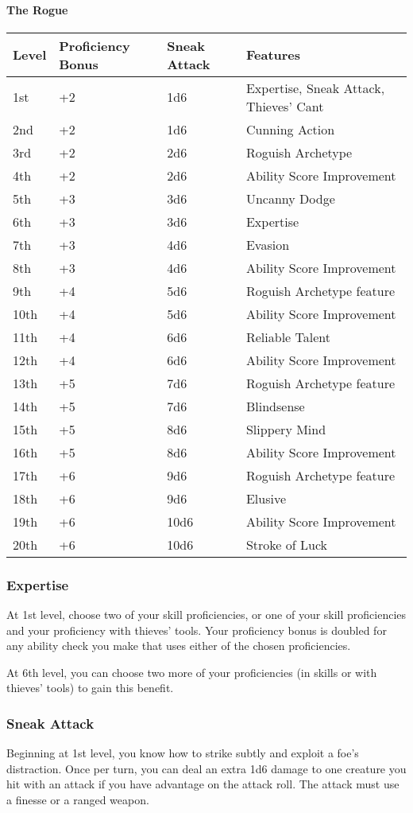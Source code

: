 \documentclass[
]{article}
\begin{document}
\hypertarget{the-rogue}{%
\paragraph{The Rogue}\label{the-rogue}}

\begin{longtable}[]{@{}llll@{}}
\toprule
Level & Proficiency Bonus & Sneak Attack & Features\tabularnewline
\midrule
\endhead
1st & +2 & 1d6 & Expertise, Sneak Attack, Thieves' Cant\tabularnewline
2nd & +2 & 1d6 & Cunning Action\tabularnewline
3rd & +2 & 2d6 & Roguish Archetype\tabularnewline
4th & +2 & 2d6 & Ability Score Improvement\tabularnewline
5th & +3 & 3d6 & Uncanny Dodge\tabularnewline
6th & +3 & 3d6 & Expertise\tabularnewline
7th & +3 & 4d6 & Evasion\tabularnewline
8th & +3 & 4d6 & Ability Score Improvement\tabularnewline
9th & +4 & 5d6 & Roguish Archetype feature\tabularnewline
10th & +4 & 5d6 & Ability Score Improvement\tabularnewline
11th & +4 & 6d6 & Reliable Talent\tabularnewline
12th & +4 & 6d6 & Ability Score Improvement\tabularnewline
13th & +5 & 7d6 & Roguish Archetype feature\tabularnewline
14th & +5 & 7d6 & Blindsense\tabularnewline
15th & +5 & 8d6 & Slippery Mind\tabularnewline
16th & +5 & 8d6 & Ability Score Improvement\tabularnewline
17th & +6 & 9d6 & Roguish Archetype feature\tabularnewline
18th & +6 & 9d6 & Elusive\tabularnewline
19th & +6 & 10d6 & Ability Score Improvement\tabularnewline
20th & +6 & 10d6 & Stroke of Luck\tabularnewline
\bottomrule
\end{longtable}

\hypertarget{expertise}{%
\subsubsection{Expertise}\label{expertise}}

At 1st level, choose two of your skill proficiencies, or one of your
skill proficiencies and your proficiency with thieves' tools. Your
proficiency bonus is doubled for any ability check you make that uses
either of the chosen proficiencies.

At 6th level, you can choose two more of your proficiencies (in skills
or with thieves' tools) to gain this benefit.

\hypertarget{sneak-attack}{%
\subsubsection{Sneak Attack}\label{sneak-attack}}

Beginning at 1st level, you know how to strike subtly and exploit a
foe's distraction. Once per turn, you can deal an extra 1d6 damage to
one creature you hit with an attack if you have advantage on the attack
roll. The attack must use a finesse or a ranged weapon.
\end{document}

